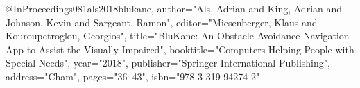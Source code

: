 @InProceedings{081als2018blukane,
author="Als, Adrian
and King, Adrian
and Johnson, Kevin
and Sargeant, Ramon",
editor="Miesenberger, Klaus
and Kouroupetroglou, Georgios",
title="BluKane: An Obstacle Avoidance Navigation App to Assist the Visually Impaired",
booktitle="Computers Helping People with Special Needs",
year="2018",
publisher="Springer International Publishing",
address="Cham",
pages="36--43",
isbn="978-3-319-94274-2"
}